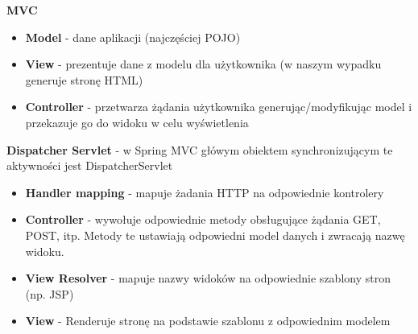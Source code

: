 \documentclass[../main.tex]{subfiles}
\begin{document}
    \textbf{MVC}
    \begin{itemize}
        \item \textbf{Model} - dane aplikacji (najczęściej POJO)
        \item \textbf{View} - prezentuje dane z modelu dla użytkownika (w naszym wypadku generuje
        stronę HTML)
        \item \textbf{Controller} - przetwarza żądania użytkownika generując/modyfikując model i przekazuje
        go do widoku w celu wyświetlenia
    \end{itemize}

    \textbf{Dispatcher Servlet} - w Spring MVC główym obiektem synchronizującym te aktywności jest
    DispatcherServlet
    \begin{itemize}
        \item \textbf{Handler mapping} - mapuje żadania HTTP na odpowiednie kontrolery
        \item \textbf{Controller} - wywołuje odpowiednie metody obsługujące żądania GET, POST, itp. Metody te
        ustawiają odpowiedni model danych i zwracają nazwę widoku.
        \item \textbf{View Resolver} - mapuje nazwy widoków na odpowiednie szablony stron (np. JSP)
        \item \textbf{View} - Renderuje stronę na podstawie szablonu z odpowiednim modelem
    \end{itemize}
\end{document}
